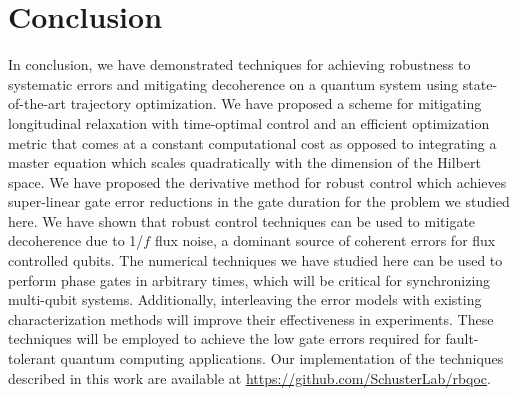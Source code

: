 \section{Conclusion}
In conclusion, we have demonstrated techniques for achieving robustness to systematic
errors and mitigating decoherence on a quantum system using state-of-the-art trajectory
optimization. We have proposed a scheme for mitigating longitudinal relaxation with time-optimal
control and an efficient optimization metric that comes at a constant computational cost as
opposed to integrating a master equation which scales quadratically with
the dimension of the Hilbert space.
We have proposed the derivative method for robust control which achieves
super-linear gate error reductions in the gate duration for the problem we studied here.
We have shown that robust control techniques can be used to mitigate decoherence due
to 1/$f$ flux noise, a dominant source of coherent errors for flux controlled qubits.
The numerical techniques we have studied here can be used to perform phase gates in arbitrary times,
which will be critical for synchronizing multi-qubit systems. Additionally,
interleaving the error models with existing
characterization methods will improve their effectiveness in experiments.
These techniques will be employed to achieve the low gate errors
required for fault-tolerant quantum computing applications. Our
implementation of the techniques described in this work are available
at \url{https://github.com/SchusterLab/rbqoc}.
